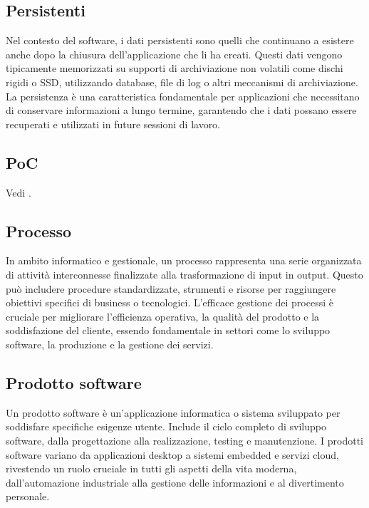 \vspace{2em}
\subsection*{Persistenti}
Nel contesto del software, i dati persistenti sono quelli che continuano a esistere anche dopo la chiusura dell'applicazione che li ha creati. Questi dati vengono tipicamente memorizzati su supporti di archiviazione non volatili come dischi rigidi o SSD, utilizzando database, file di log o altri meccanismi di archiviazione. La persistenza è una caratteristica fondamentale per applicazioni che necessitano di conservare informazioni a lungo termine, garantendo che i dati possano essere recuperati e utilizzati in future sessioni di lavoro.

\vspace{2em}
\subsection*{PoC}
\par Vedi .

\vspace{2em}
\subsection*{Processo}
In ambito informatico e gestionale, un processo rappresenta una serie organizzata di attività interconnesse finalizzate alla trasformazione di input in output. Questo può includere procedure standardizzate, strumenti e risorse per raggiungere obiettivi specifici di business o tecnologici. L'efficace gestione dei processi è cruciale per migliorare l'efficienza operativa, la qualità del prodotto e la soddisfazione del cliente, essendo fondamentale in settori come lo sviluppo software, la produzione e la gestione dei servizi.

\vspace{2em}
\subsection*{Prodotto software}
Un prodotto software è un'applicazione informatica o sistema sviluppato per soddisfare specifiche esigenze utente. Include il ciclo completo di sviluppo software, dalla progettazione alla realizzazione, testing e manutenzione. I prodotti software variano da applicazioni desktop a sistemi embedded e servizi cloud, rivestendo un ruolo cruciale in tutti gli aspetti della vita moderna, dall'automazione industriale alla gestione delle informazioni e al divertimento personale.

